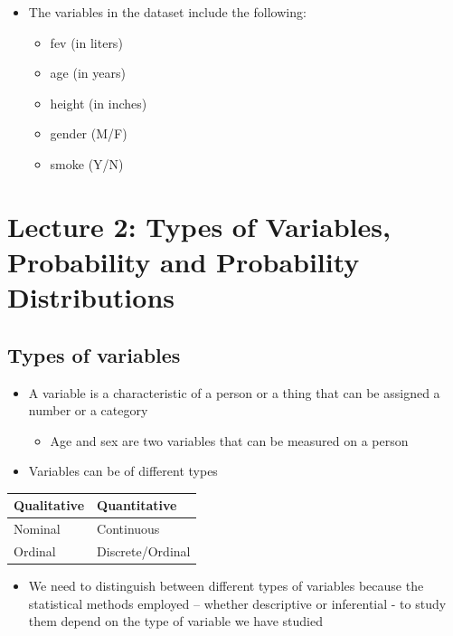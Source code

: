 \documentclass[
]{book}
\providecommand{\tightlist}{%
  \setlength{\itemsep}{0pt}\setlength{\parskip}{0pt}}
\begin{document}
\begin{itemize}
\tightlist
\item
  The variables in the dataset include the following:

  \begin{itemize}
  \tightlist
  \item
    fev (in liters)
  \item
    age (in years)
  \item
    height (in inches)
  \item
    gender (M/F)
  \item
    smoke (Y/N)
  \end{itemize}
\end{itemize}

\hypertarget{lecture-2-types-of-variables-probability-and-probability-distributions}{%
\chapter{Lecture 2: Types of Variables, Probability and Probability Distributions}\label{lecture-2-types-of-variables-probability-and-probability-distributions}}

\hypertarget{types-of-variables}{%
\section{Types of variables}\label{types-of-variables}}

\begin{itemize}
\tightlist
\item
  A variable is a characteristic of a person or a thing that can be assigned a number or a category

  \begin{itemize}
  \tightlist
  \item
    Age and sex are two variables that can be measured on a person
  \end{itemize}
\item
  Variables can be of different types
\end{itemize}

\begin{tabular}{l|l}
\hline
Qualitative & Quantitative\\
\hline
Nominal & Continuous\\
\hline
Ordinal & Discrete/Ordinal\\
\hline
\end{tabular}

\begin{itemize}
\tightlist
\item
  We need to distinguish between different types of variables because the statistical methods employed -- whether descriptive or inferential - to study them depend on the type of variable we have studied
\end{itemize}
\end{document}
